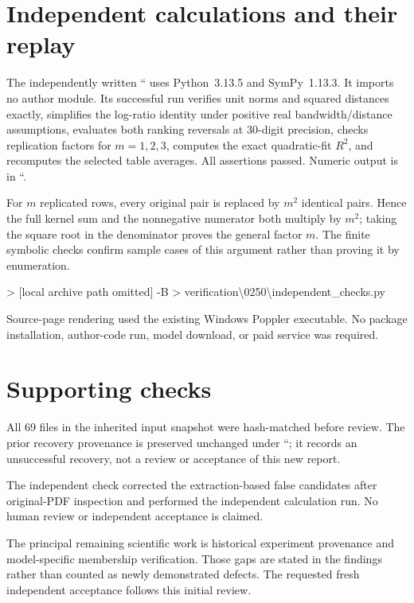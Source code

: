 \documentclass[10pt]{article}
\begin{document}
\section*{Independent calculations and their replay}
The independently written `` uses Python 3.13.5 and SymPy 1.13.3. It imports no author module. Its successful run verifies unit norms and squared distances exactly, simplifies the log-ratio identity under positive real bandwidth/distance assumptions, evaluates both ranking reversals at 30-digit precision, checks replication factors for \(m=1,2,3\), computes the exact quadratic-fit \(R^2\), and recomputes the selected table averages. All assertions passed. Numeric output is in ``.\par
For \(m\) replicated rows, every original pair is replaced by \(m^2\) identical pairs. Hence the full kernel sum and the nonnegative numerator both multiply by \(m^2\); taking the square root in the denominator proves the general factor \(m\). The finite symbolic checks confirm sample cases of this argument rather than proving it by enumeration.\par
> [local archive path omitted] -B
> verification\textbackslash{}0250\textbackslash{}independent\_checks.py\par
Source-page rendering used the existing Windows Poppler executable. No package installation, author-code run, model download, or paid service was required.\par
\section*{Supporting checks}
All 69 files in the inherited input snapshot were hash-matched before review. The prior recovery provenance is preserved unchanged under ``; it records an unsuccessful recovery, not a review or acceptance of this new report.\par
The independent check corrected the extraction-based false candidates after original-PDF inspection and performed the independent calculation run. No human review or independent acceptance is claimed.\par
The principal remaining scientific work is historical experiment provenance and model-specific membership verification. Those gaps are stated in the findings rather than counted as newly demonstrated defects. The requested fresh independent acceptance follows this initial review.\par
\end{document}
